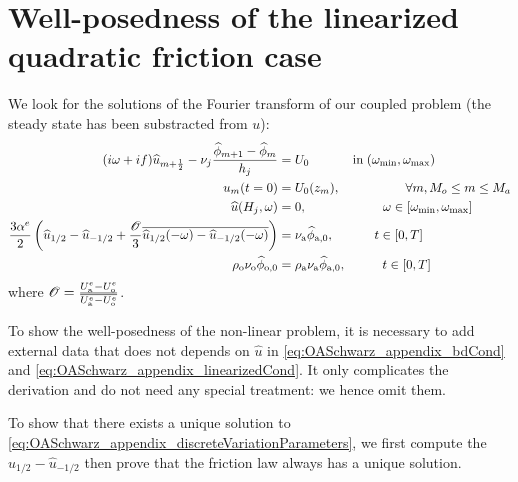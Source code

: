 \section{Well-posedness of the linearized quadratic friction case}
\label{sec:OASchwarz_appendix_discreteVariationParameters}
We look for the solutions of the Fourier transform of our
coupled problem (the steady state has been substracted from $u$):
\begin{subequations}
	\label{eq:OASchwarz_appendix_discreteVariationParameters}
	\begin{align}
	(i\omega + if) \widehat{u}_{m+\frac{1}{2}} -
		\nu_j \frac{\widehat{\phi}_{m+1} -
		\widehat{\phi}_m}{h_j}
		&=U_0
	\hspace{1.2cm} \mbox{in}\;
	(\omega_{\min},\omega_{\max})
		\label{eq:OASchwarz_appendix_eqFourier}\\
		u_m(t=0) &= U_0(z_m),   \hspace{1.8cm}
		\forall m, M_o \leq m \leq M_a \\
		\widehat{u}(H_j, \omega) &= 0,
		\hspace{2.1cm}
		\omega \in [\omega_{\min},\omega_{\max}]
		\label{eq:OASchwarz_appendix_bdCond}\\
		\frac{3\alpha^e}{2} 
		\left( \widehat{u}_{1/2} - \widehat{u}_{-1/2}
		+ \frac{{\cal O}}{3} \overline{
		\widehat{u}_{1/2}(-\omega) -
		\widehat{u}_{-1/2}(-\omega)} \right) &=
		\nu_{\rm a}\widehat{\phi}_{\rm a, 0},
		\hspace{1.12cm} t \in [0,T]
		\label{eq:OASchwarz_appendix_linearizedCond}
		\\
		\rho_{\rm o} \nu_{\rm o}\widehat{\phi}_{\rm o, 0}
		&= \rho_{\rm a} \nu_{\rm a}\widehat{\phi}_{\rm a, 0},
		\hspace{1.0cm} t \in [0,T]
		\label{eq:OASchwarz_appendix_continuityFlux}
		\end{align}
		\end{subequations}
where ${\cal O} = \frac{U_{\rm a}^e - U_{\rm o}^e}{\overline{U_{\rm a}^e
	- U_{\rm o}^e}}$.
\begin{remark}
	To show the well-posedness of the non-linear
	problem, it is necessary to add external data
	that does not depends on $\widehat{u}$
	in \eqref{eq:OASchwarz_appendix_bdCond} and
	\eqref{eq:OASchwarz_appendix_linearizedCond}.
	It only complicates the derivation and do not need
	any special treatment: we hence omit them.
\end{remark}
To show that there exists a unique solution to
\eqref{eq:OASchwarz_appendix_discreteVariationParameters},
we first compute the $\widehat{u}_{1/2} - \widehat{u}_{-1/2}$
then prove that the friction law always has a unique solution.
